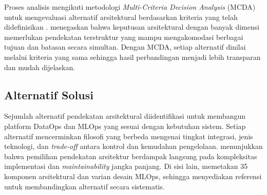 Proses analisis mengikuti metodologi \textit{Multi-Criteria Decision Analysis} (MCDA) untuk mengevaluasi alternatif arsitektural berdasarkan kriteria yang telah didefinisikan \autocite{saaty2008decision}. \textcite{triantaphyllou2000multi} menegaskan bahwa keputusan arsitektural dengan banyak dimensi memerlukan pendekatan terstruktur yang mampu mengakomodasi berbagai tujuan dan batasan secara simultan. Dengan MCDA, setiap alternatif dinilai melalui kriteria yang sama sehingga hasil perbandingan menjadi lebih transparan dan mudah dijelaskan.

\subsection{Alternatif Solusi}

Sejumlah alternatif pendekatan arsitektural diidentifikasi untuk membangun platform DataOps dan MLOps yang sesuai dengan kebutuhan sistem. Setiap alternatif mencerminkan filosofi yang berbeda mengenai tingkat integrasi, jenis teknologi, dan \textit{trade-off} antara kontrol dan kemudahan pengelolaan. \textcite{burgueno2025toward} menunjukkan bahwa pemilihan pendekatan arsitektur berdampak langsung pada kompleksitas implementasi dan \textit{maintainability} jangka panjang. Di sisi lain, \textcite{najafabadi2024analysis} memetakan 35 komponen arsitektural dan varian desain MLOps, sehingga menyediakan referensi untuk membandingkan alternatif secara sistematis.

